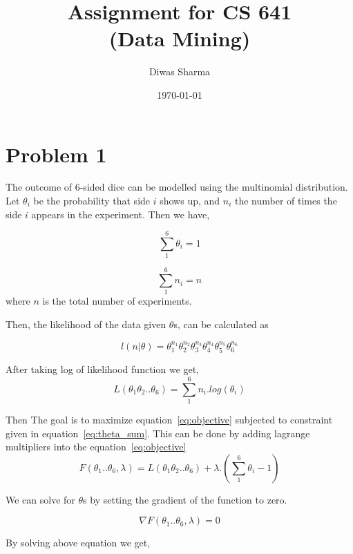 \documentclass{article}
\title{Assignment for CS 641 \\ (Data Mining)}
\author{Diwas Sharma}
\date{\today}
\begin{document}
\maketitle
\newpage

\section{Problem 1}
The outcome of 6-sided dice can be modelled using the multinomial
distribution. Let $\theta_{i}$ be the probability that side $i$ shows up,
and $n_{i}$ the number of times the side ${i}$ appears in the experiment. Then we
have,

\begin{equation}
\label{eq:theta_sum}
\sum_{1}^{6}\theta_{i} = 1
\end{equation}

\begin{equation}
\label{eq:n_sum}
\sum_{1}^{6}n_{i} = n
\end{equation}
where $n$ is the total number of experiments.

Then, the likelihood of the data given $\theta$s, can be calculated as

\begin{equation}
l(n|\theta) = \theta_{1}^{n_1}\theta_{2}^{n_2}\theta_{3}^{n_3}\theta_{4}^{n_4}\theta_{5}^{n_5}\theta_{6}^{n_6}
\end{equation}

After taking log of likelihood function we get,
\begin{equation}
\label{eq:objective}
L(\theta_{1}\theta_{2}..\theta_{6})=\sum_{1}^{6}n_i.log(\theta_{i})
\end{equation}

Then The goal is to maximize equation~\ref{eq:objective} subjected to
constraint given in equation~\ref{eq:theta_sum}. This can be done by 
adding lagrange multipliers into the equation~\ref{eq:objective}
\begin{equation}
F(\theta_{1}..\theta_{6},\lambda) = L(\theta_{1}\theta_{2}..\theta_{6}) + \lambda.(\sum_{1}^6\theta_{i} - 1)
\end{equation}

We can solve for $\theta$s by setting the gradient of the function to zero.

\begin{equation}
\nabla F(\theta_{1}..\theta_{6},\lambda) = 0
\end{equation}

By solving above equation we get,
\end{document}
